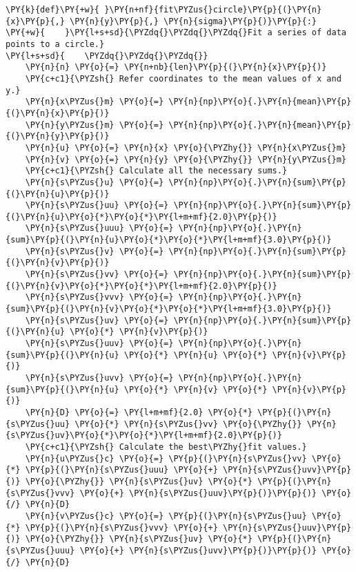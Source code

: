 \begin{Verbatim}[label=\makebox{\href{https://github.com/unipi-physics-labs/lab1-notes/tree/main/snippy/fit_circle.py}{https://github.com/.../fit\_circle.py}},commandchars=\\\{\}]
\PY{k}{def}\PY{+w}{ }\PY{n+nf}{fit\PYZus{}circle}\PY{p}{(}\PY{n}{x}\PY{p}{,} \PY{n}{y}\PY{p}{,} \PY{n}{sigma}\PY{p}{)}\PY{p}{:}
\PY{+w}{    }\PY{l+s+sd}{\PYZdq{}\PYZdq{}\PYZdq{}Fit a series of data points to a circle.}
\PY{l+s+sd}{    \PYZdq{}\PYZdq{}\PYZdq{}}
    \PY{n}{n} \PY{o}{=} \PY{n+nb}{len}\PY{p}{(}\PY{n}{x}\PY{p}{)}
    \PY{c+c1}{\PYZsh{} Refer coordinates to the mean values of x and y.}
    \PY{n}{x\PYZus{}m} \PY{o}{=} \PY{n}{np}\PY{o}{.}\PY{n}{mean}\PY{p}{(}\PY{n}{x}\PY{p}{)}
    \PY{n}{y\PYZus{}m} \PY{o}{=} \PY{n}{np}\PY{o}{.}\PY{n}{mean}\PY{p}{(}\PY{n}{y}\PY{p}{)}
    \PY{n}{u} \PY{o}{=} \PY{n}{x} \PY{o}{\PYZhy{}} \PY{n}{x\PYZus{}m}
    \PY{n}{v} \PY{o}{=} \PY{n}{y} \PY{o}{\PYZhy{}} \PY{n}{y\PYZus{}m}
    \PY{c+c1}{\PYZsh{} Calculate all the necessary sums.}
    \PY{n}{s\PYZus{}u} \PY{o}{=} \PY{n}{np}\PY{o}{.}\PY{n}{sum}\PY{p}{(}\PY{n}{u}\PY{p}{)}
    \PY{n}{s\PYZus{}uu} \PY{o}{=} \PY{n}{np}\PY{o}{.}\PY{n}{sum}\PY{p}{(}\PY{n}{u}\PY{o}{*}\PY{o}{*}\PY{l+m+mf}{2.0}\PY{p}{)}
    \PY{n}{s\PYZus{}uuu} \PY{o}{=} \PY{n}{np}\PY{o}{.}\PY{n}{sum}\PY{p}{(}\PY{n}{u}\PY{o}{*}\PY{o}{*}\PY{l+m+mf}{3.0}\PY{p}{)}
    \PY{n}{s\PYZus{}v} \PY{o}{=} \PY{n}{np}\PY{o}{.}\PY{n}{sum}\PY{p}{(}\PY{n}{v}\PY{p}{)}
    \PY{n}{s\PYZus{}vv} \PY{o}{=} \PY{n}{np}\PY{o}{.}\PY{n}{sum}\PY{p}{(}\PY{n}{v}\PY{o}{*}\PY{o}{*}\PY{l+m+mf}{2.0}\PY{p}{)}
    \PY{n}{s\PYZus{}vvv} \PY{o}{=} \PY{n}{np}\PY{o}{.}\PY{n}{sum}\PY{p}{(}\PY{n}{v}\PY{o}{*}\PY{o}{*}\PY{l+m+mf}{3.0}\PY{p}{)}
    \PY{n}{s\PYZus{}uv} \PY{o}{=} \PY{n}{np}\PY{o}{.}\PY{n}{sum}\PY{p}{(}\PY{n}{u} \PY{o}{*} \PY{n}{v}\PY{p}{)}
    \PY{n}{s\PYZus{}uuv} \PY{o}{=} \PY{n}{np}\PY{o}{.}\PY{n}{sum}\PY{p}{(}\PY{n}{u} \PY{o}{*} \PY{n}{u} \PY{o}{*} \PY{n}{v}\PY{p}{)}
    \PY{n}{s\PYZus{}uvv} \PY{o}{=} \PY{n}{np}\PY{o}{.}\PY{n}{sum}\PY{p}{(}\PY{n}{u} \PY{o}{*} \PY{n}{v} \PY{o}{*} \PY{n}{v}\PY{p}{)}
    \PY{n}{D} \PY{o}{=} \PY{l+m+mf}{2.0} \PY{o}{*} \PY{p}{(}\PY{n}{s\PYZus{}uu} \PY{o}{*} \PY{n}{s\PYZus{}vv} \PY{o}{\PYZhy{}} \PY{n}{s\PYZus{}uv}\PY{o}{*}\PY{o}{*}\PY{l+m+mf}{2.0}\PY{p}{)}
    \PY{c+c1}{\PYZsh{} Calculate the best\PYZhy{}fit values.}
    \PY{n}{u\PYZus{}c} \PY{o}{=} \PY{p}{(}\PY{n}{s\PYZus{}vv} \PY{o}{*} \PY{p}{(}\PY{n}{s\PYZus{}uuu} \PY{o}{+} \PY{n}{s\PYZus{}uvv}\PY{p}{)} \PY{o}{\PYZhy{}} \PY{n}{s\PYZus{}uv} \PY{o}{*} \PY{p}{(}\PY{n}{s\PYZus{}vvv} \PY{o}{+} \PY{n}{s\PYZus{}uuv}\PY{p}{)}\PY{p}{)} \PY{o}{/} \PY{n}{D}
    \PY{n}{v\PYZus{}c} \PY{o}{=} \PY{p}{(}\PY{n}{s\PYZus{}uu} \PY{o}{*} \PY{p}{(}\PY{n}{s\PYZus{}vvv} \PY{o}{+} \PY{n}{s\PYZus{}uuv}\PY{p}{)} \PY{o}{\PYZhy{}} \PY{n}{s\PYZus{}uv} \PY{o}{*} \PY{p}{(}\PY{n}{s\PYZus{}uuu} \PY{o}{+} \PY{n}{s\PYZus{}uvv}\PY{p}{)}\PY{p}{)} \PY{o}{/} \PY{n}{D}

\end{Verbatim}
